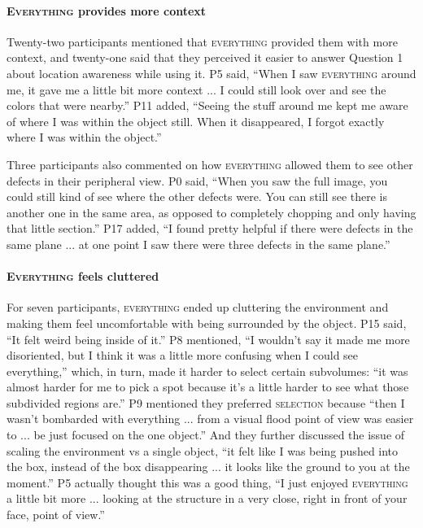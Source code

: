 \paragraph{\textbf{\textsc{Everything} provides more context}}
Twenty-two participants mentioned that \textsc{everything} provided them with more context, and twenty-one said that they perceived it easier to answer Question 1 about location awareness while using it. P5 said, ``When I saw \textsc{everything} around me, it gave me a little bit more context ... I could still look over and see the colors that were nearby.'' P11 added, ``Seeing the stuff around me kept me aware of where I was within the object still. When it disappeared, I forgot exactly where I was within the object.''

Three participants also commented on how \textsc{everything} allowed them to see other defects in their peripheral view. P0 said, ``When you saw the full image, you could still kind of see where the other defects were. You can still see there is another one in the same area, as opposed to completely chopping and only having that little section.'' P17 added, ``I found pretty helpful if there were defects in the same plane ... at one point I saw there were three defects in the same plane.''

\paragraph{\textbf{\textsc{Everything} feels cluttered}}
For seven participants, \textsc{everything} ended up cluttering the environment and making them feel uncomfortable with being surrounded by the object. P15 said, ``It felt weird being inside of it.'' P8 mentioned, ``I wouldn't say it made me more disoriented, but I think it was a little more confusing when I could see everything,'' which, in turn, made it harder to select certain subvolumes: ``it was almost harder for me to pick a spot because it's a little harder to see what those subdivided regions are.'' P9 mentioned they preferred \textsc{selection} because ``then I wasn't bombarded with everything ... from a visual flood point of view was easier to ... be just focused on the one object.'' And they further discussed the issue of scaling the environment vs a single object, ``it felt like I was being pushed into the box, instead of the box disappearing ... it looks like the ground to you at the moment.'' P5 actually thought this was a good thing, ``I just enjoyed \textsc{everything} a little bit more ... looking at the structure in a very close, right in front of your face, point of view.''

